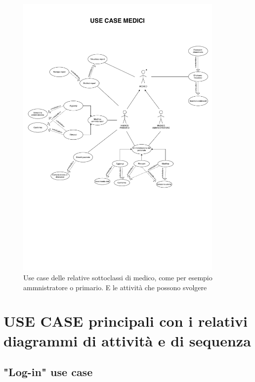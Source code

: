 \documentclass{article}
\begin{document}
	\vspace{0.5cm}

	\begin{figure}[H]

		\includegraphics[width=0.9\textwidth]{documenti/useCase_medici.pdf}
		\caption{Use case delle relative sottoclassi di medico, come per esempio ammnistratore o primario.  E le attività che possono svolgere}
		\label{usecase_medici}

	\end{figure}

	\vspace{0.5cm}


\newpage




\section{USE CASE principali con i relativi diagrammi di attività e di sequenza}

\subsection{"Log-in" use case}
\end{document}
